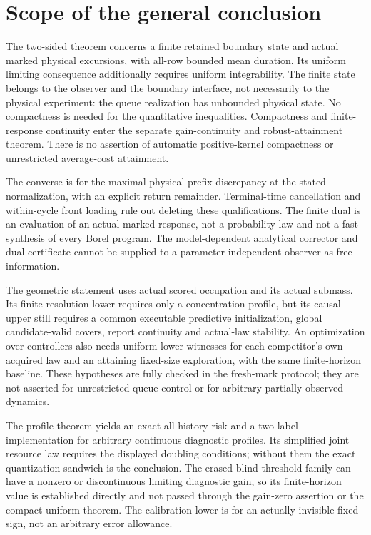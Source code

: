 \section{Scope of the general conclusion}\label{sec:scope}
The two-sided theorem concerns a finite retained boundary state and actual marked physical excursions, with all-row bounded mean duration. Its uniform limiting consequence additionally requires uniform integrability. The finite state belongs to the observer and the boundary interface, not necessarily to the physical experiment: the queue realization has unbounded physical state. No compactness is needed for the quantitative inequalities. Compactness and finite-response continuity enter the separate gain-continuity and robust-attainment theorem. There is no assertion of automatic positive-kernel compactness or unrestricted average-cost attainment.

The converse is for the maximal physical prefix discrepancy at the stated normalization, with an explicit return remainder. Terminal-time cancellation and within-cycle front loading rule out deleting these qualifications. The finite dual is an evaluation of an actual marked response, not a probability law and not a fast synthesis of every Borel program. The model-dependent analytical corrector and dual certificate cannot be supplied to a parameter-independent observer as free information.

The geometric statement uses actual scored occupation and its actual submass. Its finite-resolution lower requires only a concentration profile, but its causal upper still requires a common executable predictive initialization, global candidate-valid covers, report continuity and actual-law stability. An optimization over controllers also needs uniform lower witnesses for each competitor's own acquired law and an attaining fixed-size exploration, with the same finite-horizon baseline. These hypotheses are fully checked in the fresh-mark protocol; they are not asserted for unrestricted queue control or for arbitrary partially observed dynamics.

The profile theorem yields an exact all-history risk and a two-label implementation for arbitrary continuous diagnostic profiles. Its simplified joint resource law requires the displayed doubling conditions; without them the exact quantization sandwich is the conclusion. The erased blind-threshold family can have a nonzero or discontinuous limiting diagnostic gain, so its finite-horizon value is established directly and not passed through the gain-zero assertion or the compact uniform theorem. The calibration lower is for an actually invisible fixed sign, not an arbitrary error allowance.

